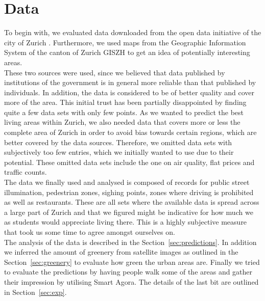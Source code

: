 \documentclass[letterpaper]{article}
\begin{document}
\section{Data}\label{sec:data}
To begin with, we evaluated data downloaded from the open data initiative of the city of Zurich \cite{ZurichOD}.
Furthermore, we used maps from the Geographic Information System of the canton of Zurich GISZH \cite{GISZH}
to get an idea of potentially interesting areas.\\
\indent These two sources were used, since we believed that data published by institutions of the government
is in general more reliable than that published by individuals. In addition, the data is considered to be of better
quality and cover more of the area. This initial trust has been partially disappointed by finding quite a few data
sets with only few points. As we wanted to predict the best living areas within Zurich, we also needed data that covers
more or less the complete area of Zurich in order to avoid bias towards certain regions, which are better covered
by the data sources. Therefore, we omitted data sets with subjectively too few entries, which we initially wanted
to use due to their potential. These omitted data sets include the one on air quality, flat prices and traffic counts.\\
\indent The data we finally used and analysed is composed of records for public street illumination, pedestrian zones,
sighing points, zones where driving is prohibited as well as restaurants. These are all sets where the available data
is spread across a large part of Zurich and that we figured might be indicative for how much we as students would
appreciate living there. This is a highly subjective measure that took us some time to agree amongst ourselves on.\\
\indent The analysis of the data is described in the Section~\ref{sec:predictions}. In addition we inferred the amount
of greenery from satellite images as outlined in the Section~\ref{sec:greenery} to evaluate how green the urban areas are.
Finally we tried to evaluate the predictions by having people walk some of the areas and gather their impression
by utilising Smart Agora. The details of the last bit are outlined in Section~\ref{sec:exp}.
\end{document}
